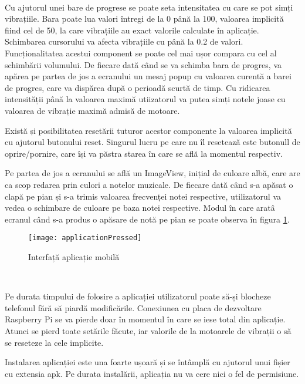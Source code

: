 \documentclass[../IoMusT.tex]{subfiles}
\begin{document}
\\
\par Cu ajutorul unei bare de progrese se poate seta intensitatea cu care se pot simți vibrațiile. Bara poate lua valori întregi de la 0 până la 100, valoarea implicită fiind cel de 50, la care vibrațiile au exact valorile calculate în aplicație. Schimbarea cursorului va afecta vibrațiile cu
 până la 0.2 de valori. Funcționalitatea acestui component se poate cel mai ușor compara cu cel al schimbării volumului. De fiecare dată când se va schimba bara de progres, va apărea pe partea de jos a ecranului un mesaj popup cu valoarea curentă a barei de progres, care va dispărea după o perioadă scurtă de timp. Cu ridicarea intensității până la valoarea maximă utiizatorul va putea simți notele joase cu valoarea de vibrație maximă admisă de motoare.
\\
\par Există și posibilitatea resetării tuturor acestor componente la valoarea implicită cu ajutorul butonului reset. Singurul lucru pe care nu îl resetează este butonull de oprire/pornire, care își va păstra starea în care se află la momentul respectiv.
\\
\par Pe partea de jos a ecranului se află un ImageView, inițial de culoare albă, care are ca scop redarea prin culori a notelor muzicale. De fiecare dată când s-a apăsat o clapă pe pian și s-a trimis valoarea frecvenței notei respective, utilizatorul va vedea o schimbare de culoare pe baza notei respective. Modul în care aratâ ecranul când s-a produs o apăsare de notă pe pian se poate observa în figura \ref{fig:applicationPressed}.
\begin{figure}[h]
\begin{center}
\texttt{[image: applicationPressed]}
\caption{Interfață aplicație mobilă}
\label{fig:applicationPressed}
\end{center}
\end{figure}
\\
\par Pe durata timpului de folosire a aplicației utilizatorul poate să-și blocheze telefonul fără să piardă modificările. Conexiunea cu placa de dezvoltare Raspberry Pi se va pierde doar în momentul în care se iese total din aplicație. Atunci se pierd toate setările făcute, iar valorile de la motoarele de vibrații o să se reseteze la cele implicite.
\\
\par Instalarea aplicației este una foarte ușoară și se întâmplă cu ajutorul unui fișier cu extensia apk. Pe durata instalării, aplicația nu va cere nici o fel de permisiune.
\end{document}
